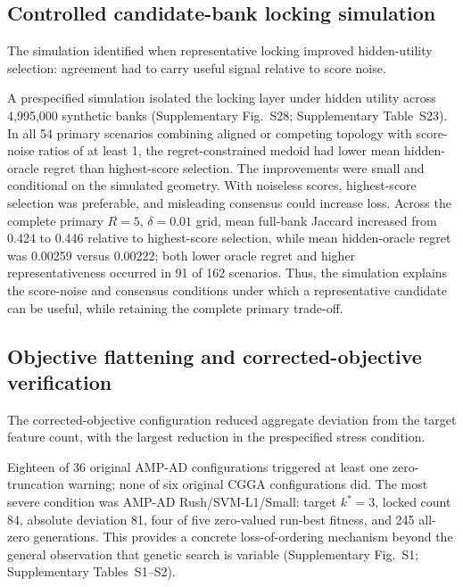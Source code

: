 \subsection{Controlled candidate-bank locking simulation}

The simulation identified when representative locking improved hidden-utility selection: agreement had to carry useful signal relative to score noise.

A prespecified simulation isolated the locking layer under hidden utility across 4,995,000 synthetic banks (Supplementary Fig.~S28; Supplementary Table~S23). In all 54 primary scenarios combining aligned or competing topology with score-noise ratios of at least 1, the regret-constrained medoid had lower mean hidden-oracle regret than highest-score selection. The improvements were small and conditional on the simulated geometry. With noiseless scores, highest-score selection was preferable, and misleading consensus could increase loss. Across the complete primary $R=5$, $\delta=0.01$ grid, mean full-bank Jaccard increased from 0.424 to 0.446 relative to highest-score selection, while mean hidden-oracle regret was 0.00259 versus 0.00222; both lower oracle regret and higher representativeness occurred in 91 of 162 scenarios. Thus, the simulation explains the score-noise and consensus conditions under which a representative candidate can be useful, while retaining the complete primary trade-off.

\subsection{Objective flattening and corrected-objective verification}
\label{sec:objective-verification}

The corrected-objective configuration reduced aggregate deviation from the target feature count, with the largest reduction in the prespecified stress condition.

Eighteen of 36 original AMP-AD configurations triggered at least one zero-truncation warning; none of six original CGGA configurations did. The most severe condition was AMP-AD Rush/SVM-L1/Small: target \(k^*=3\), locked count 84, absolute deviation 81, four of five zero-valued run-best fitness, and 245 all-zero generations. This provides a concrete loss-of-ordering mechanism beyond the general observation that genetic search is variable (Supplementary Fig.~S1; Supplementary Tables~S1--S2).

